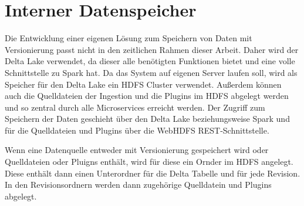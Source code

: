 \section{Interner Datenspeicher}

Die Entwicklung einer eigenen Lösung zum Speichern von Daten mit Versionierung passt nicht in den zeitlichen Rahmen dieser Arbeit.
Daher wird der Delta Lake verwendet, da dieser alle benötigten Funktionen bietet und eine volle Schnittstelle zu Spark hat.
Da das System auf eigenen Server laufen soll, wird als Speicher für den Delta Lake ein HDFS Cluster verwendet.
Außerdem können auch die Quelldateien der Ingestion und die Plugins im HDFS abgelegt werden und so zentral durch alle Microservices erreicht werden.
Der Zugriff zum Speichern der Daten geschieht über den Delta Lake beziehungsweise Spark und für die Quelldateien und Plugins über die WebHDFS REST-Schnittstelle.

Wenn eine Datenquelle entweder mit Versionierung gespeichert wird oder Quelldateien oder Pluigns enthält, wird für diese ein Ornder im HDFS angelegt.
Diese enthält dann einen Unterordner für die Delta Tabelle und für jede Revision.
In den Revisionsordnern werden dann zugehörige Quelldatein und Plugins abgelegt. 